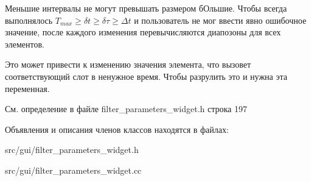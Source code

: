 Меньшие интервалы не могут превышать размером бОльшие. Чтобы всегда выполнялось $T_{max} \geq \delta t \geq \delta \tau \geq \Delta t$ и пользователь не мог ввести явно ошибочное значение, после каждого изменения перевычисляются диапозоны для всех элементов.

Это может привести к изменению значения элемента, что вызовет соответствующий слот в ненужное время. Чтобы разрулить это и нужна эта переменная. 

См. определение в файле filter\+\_\+parameters\+\_\+widget.\+h строка 197



Объявления и описания членов классов находятся в файлах\+:\begin{DoxyCompactItemize}
\item 
src/gui/filter\+\_\+parameters\+\_\+widget.\+h\item 
src/gui/filter\+\_\+parameters\+\_\+widget.\+cc\end{DoxyCompactItemize}

